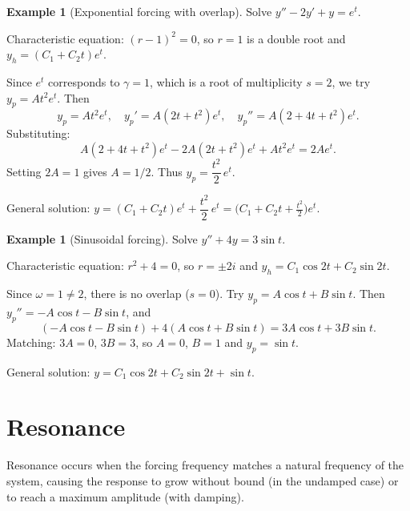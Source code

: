 \documentclass[12pt,a4paper,openany]{book}
\theoremstyle{definition}
\newtheorem{example}[definition]{Example}
\theoremstyle{plain}
\theoremstyle{remark}
\begin{document}
\begin{example}[Exponential forcing with overlap]\label{ex:exp-overlap}
Solve $y'' - 2y' + y = e^t$.

Characteristic equation: $(r-1)^2 = 0$, so $r = 1$ is a double root and
$y_h = (C_1 + C_2 t)e^t$.

Since $e^t$ corresponds to $\gamma = 1$, which is a root of multiplicity
$s = 2$, we try $y_p = At^2 e^t$. Then
\[
  y_p = At^2 e^t, \quad
  y_p' = A(2t + t^2)e^t, \quad
  y_p'' = A(2 + 4t + t^2)e^t.
\]
Substituting:
\[
  A(2+4t+t^2)e^t - 2A(2t+t^2)e^t + At^2 e^t = 2Ae^t.
\]
Setting $2A = 1$ gives $A = 1/2$. Thus $y_p = \dfrac{t^2}{2}\,e^t$.

General solution: $y = (C_1 + C_2 t)e^t + \dfrac{t^2}{2}\,e^t
= \bigl(C_1 + C_2 t + \tfrac{t^2}{2}\bigr)e^t$.
\end{example}

\begin{example}[Sinusoidal forcing]\label{ex:sin-forcing}
Solve $y'' + 4y = 3\sin t$.

Characteristic equation: $r^2 + 4 = 0$, so $r = \pm 2i$ and
$y_h = C_1\cos 2t + C_2\sin 2t$.

Since $\omega = 1 \ne 2$, there is no overlap ($s = 0$).
Try $y_p = A\cos t + B\sin t$.
Then $y_p'' = -A\cos t - B\sin t$, and
\[
  (-A\cos t - B\sin t) + 4(A\cos t + B\sin t) = 3A\cos t + 3B\sin t.
\]
Matching: $3A = 0$, $3B = 3$, so $A = 0$, $B = 1$ and $y_p = \sin t$.

General solution: $y = C_1\cos 2t + C_2\sin 2t + \sin t$.
\end{example}

\section{Resonance}\label{sec:resonance}

Resonance occurs when the forcing frequency matches a natural frequency of
the system, causing the response to grow without bound (in the undamped case)
or to reach a maximum amplitude (with damping).
\end{document}
